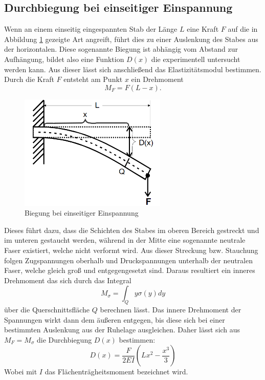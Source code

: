 \subsection{Durchbiegung bei einseitiger Einspannung}
Wenn an einem einseitig eingespannten Stab der Länge $L$ eine Kraft $F$ auf die in Abbildung \ref{fig:einseitig} gezeigte Art angreift, führt dies zu einer Auslenkung des Stabes
aus der horizontalen. Diese sogenannte Biegung ist abhängig vom Abstand zur Aufhängung, bildet also eine Funktion $D(x)$ die experimentell untersucht werden kann. 
Aus dieser lässt sich anschließend das Elastizitätsmodul bestimmen. Durch die Kraft $F$ entsteht am Punkt $x$ ein Drehmoment 
\begin{equation*}
M_F=F(L-x).
\end{equation*}
\begin{figure}
\centering
\includegraphics[width=7cm, keepaspectratio]{Biegung einseitig}
\caption{Biegung bei einseitiger Einspannung}
\label{fig:einseitig}
\end{figure}
Dieses führt dazu, dass die Schichten des Stabes im oberen Bereich gestreckt und im unteren gestaucht werden, während in der Mitte eine sogenannte neutrale Faser existiert,
welche nicht verformt wird. Aus dieser Streckung bzw. Stauchung folgen Zugspannungen oberhalb und Druckspannungen unterhalb der neutralen Faser, welche gleich groß und entgegengesetzt sind. Daraus resultiert ein inneres Drehmoment das sich durch das Integral
\begin{equation*}
M_{\sigma}=\int_{Q} y\sigma (y) dy
\end{equation*}
über die Querschnittsfläche $Q$ berechnen lässt. Das innere Drehmoment der Spannungen wirkt dann dem äußeren entgegen, bis diese sich bei einer bestimmten Auslenkung aus der Ruhelage ausgleichen. Daher lässt sich aus $M_F=M_{\sigma}$ die Durchbiegung 
$D(x)$ bestimmen:
\begin{equation}
D(x)=\frac{F}{2EI}(Lx^2-\frac{x^3}{3})
\end{equation}
Wobei mit $I$ das Flächenträgheitsmoment bezeichnet wird. \\
